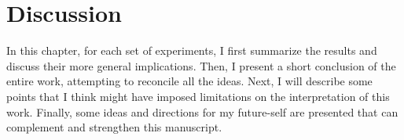 \chapter{Discussion}
\label{ch:discussion}
In this chapter, for each set of experiments, I first summarize the results and discuss their more general implications.
Then, I present a short conclusion of the entire work, attempting to reconcile all the ideas.
Next, I will describe some points that I think might have imposed limitations on the interpretation of this work.
Finally, some ideas and directions for my future-self are presented that can complement and strengthen this manuscript.




